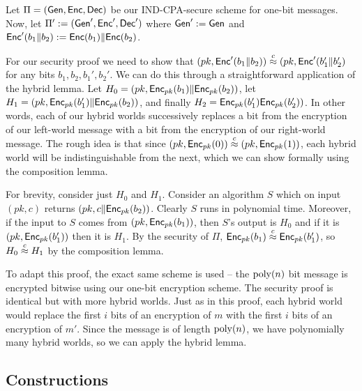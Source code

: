 \documentclass[11pt]{article}
\begin{document}
\begin{answer}
  Let \(\Pi = (\mathsf{Gen}, \mathsf{Enc}, \mathsf{Dec})\) be our IND-CPA-secure
  scheme for one-bit messages. Now, let
  \(\Pi' := (\mathsf{Gen}', \mathsf{Enc}', \mathsf{Dec}')\) where
  \(\mathsf{Gen}' := \mathsf{Gen}\) and
  \(\mathsf{Enc}'(b_1 \| b_2) := \mathsf{Enc}(b_1) \| \mathsf{Enc}(b_2)\).
  
  For our security proof we need to show that
  \((pk, \mathsf{Enc}'(b_1 \| b_2)) \stackrel{c}{\approx} (pk, \mathsf{Enc}'(b_1'
  \| b_2')\) for any bits \(b_1, b_2, b_1', b_2'\). We can do
  this through a straightforward application of the hybrid lemma. Let
  \(H_0 = (pk, \mathsf{Enc}_{pk}(b_1) \| \mathsf{Enc}_{pk}(b_2))\), let
  \(H_1 = (pk, \mathsf{Enc}_{pk}(b_1') \| \mathsf{Enc}_{pk}(b_2))\), and
  finally \(H_2 = \mathsf{Enc}_{pk}(b_1') \mathsf{Enc}_{pk}(b_2'))\). In other
  words, each of our hybrid worlds successively replaces a bit from
  the encryption of our left-world message with a bit from the
  encryption of our right-world message. The rough idea is that since
  \((pk, \mathsf{Enc}_{pk}(0)) \stackrel{c}{\approx} (pk, \mathsf{Enc}_{pk}(1))\), each
  hybrid world will be indistinguishable from the next, which we can
  show formally using the composition
  lemma.

  For brevity, consider just \(H_0\) and \(H_1\). Consider an
  algorithm \(S\) which on input \((pk, c)\) returns
  \((pk, c \| \mathsf{Enc}_{pk}(b_2))\). Clearly \(S\) runs in
  polynomial time. Moreover, if the input to \(S\) comes from
  \((pk, \mathsf{Enc}_{pk}(b_1))\), then \(S\)'s output is \(H_0\) and if
  it is \((pk, \mathsf{Enc}_{pk}(b_1'))\) then it is \(H_1\). By the
  security of \(\Pi\),
  \(\mathsf{Enc}_{pk}(b_1) \stackrel{c}{\approx} \mathsf{Enc}_{pk}(b_1')\), so
  \(H_0 \stackrel{c}{\approx} H_1\) by the composition lemma.

  To adapt this proof, the exact same scheme is used -- the
  \(\operatorname{poly}(n)\) bit message is encrypted bitwise using our one-bit
  encryption scheme. The security proof is identical but with more
  hybrid worlds. Just as in this proof, each hybrid world would
  replace the first \(i\) bits of an encryption of \(m\) with the
  first \(i\) bits of an encryption of \(m'\). Since the message is of
  length \(\operatorname{poly}(n)\), we have polynomially many hybrid worlds, so we
  can apply the hybrid lemma.
\end{answer}

\subsection{Constructions}
\label{sec:constructions}
\end{document}

